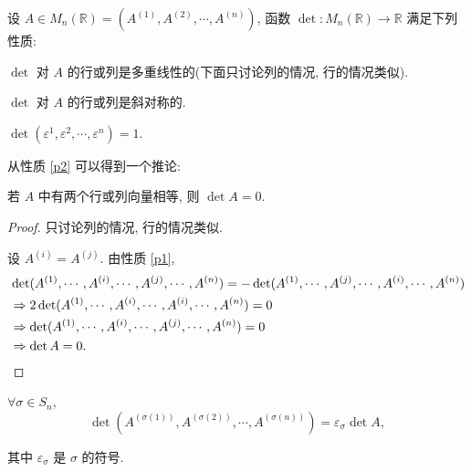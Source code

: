 \documentclass[color=black,device=normal,lang=cn,mode=geye]{elegantnote}
\begin{document}
设 $A\in M_n(\mathbb{R})=(A^{(1)},A^{(2)},\cdots,A^{(n)})$, 函数 $\det:M_n(\mathbb{R})\to\mathbb{R}$ 满足下列性质:
\begin{property}\label{p1}
    $\det$ 对 $A$ 的行或列是多重线性的(下面只讨论列的情况, 行的情况类似).
\end{property}
\begin{property}\label{p2}
    $\det$ 对 $A$ 的行或列是斜对称的.
\end{property}
\begin{property}\label{p3}
    $\det(\varepsilon^1,\varepsilon^2,\cdots,\varepsilon^n)=1$.
\end{property}
从性质 \ref{p2} 可以得到一个推论:
\begin{corollary}\label{c1}
    若 $A$ 中有两个行或列向量相等, 则 $\det A=0$.
\end{corollary}
\begin{proof}
    只讨论列的情况, 行的情况类似.

    设 $A^{(i)}=A^{(j)}$. 由性质 \ref{p1},
    \begin{align*}
        & \det(A^{(1)},\cdots,A^{(i)},\cdots,A^{(j)},\cdots,A^{(n)})=-\det(A^{(1)},\cdots,A^{(j)},\cdots,A^{(i)},\cdots,A^{(n)}) \\
        & \Rightarrow2\det(A^{(1)},\cdots,A^{(i)},\cdots,A^{(i)},\cdots,A^{(n)})=0 \\
        & \Rightarrow\det(A^{(1)},\cdots,A^{(i)},\cdots,A^{(j)},\cdots,A^{(n)})=0 \\
        & \Rightarrow\det A=0.\qedhere
    \end{align*}
\end{proof}
\begin{corollary}\label{c2}
    $\forall\sigma\in S_n$,
    \[\det(A^{(\sigma(1))},A^{(\sigma(2))},\cdots,A^{(\sigma(n))})=\varepsilon_\sigma\det A,\]

    其中 $\varepsilon_\sigma$ 是 $\sigma$ 的符号.
\end{corollary}
\end{document}
